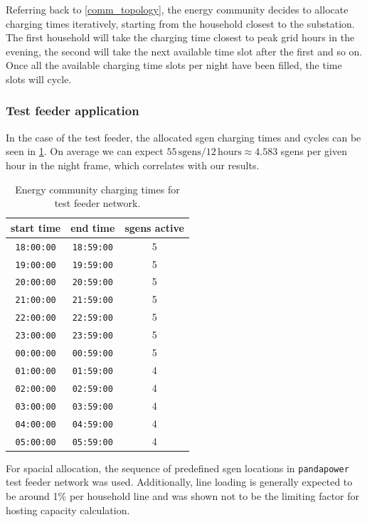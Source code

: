 \documentclass[a4paper,10pt]{report}
\begin{document}
Referring back to \cref{comm_topology}, the energy community decides to allocate charging times iteratively, starting from the household closest to the substation. The first household will take the charging time closest to peak grid hours in the evening, the second will take the next available time slot after the first and so on. Once all the available charging time slots per night have been filled, the time slots will cycle.



\subsubsection{Test feeder application}
In the case of the test feeder, the allocated sgen charging times and cycles can be seen in \cref{sgen_comm_times}. On average we can expect $55\, \text{sgens} / 12\, \text{hours} \approx 4.583$ sgens per given hour in the night frame, which correlates with our results.

\begin{table}[htpb]
	\centering
	\begin{tabular}{c c c}
		\toprule
		start time & end time & sgens active \\
		\midrule
		\texttt{18:00:00} & \texttt{18:59:00} & 5\\
		\texttt{19:00:00} & \texttt{19:59:00} & 5\\
		\texttt{20:00:00} & \texttt{20:59:00} & 5\\
		\texttt{21:00:00} & \texttt{21:59:00} & 5\\
		\texttt{22:00:00} & \texttt{22:59:00} & 5\\
		\texttt{23:00:00} & \texttt{23:59:00} & 5\\
		\texttt{00:00:00} & \texttt{00:59:00} & 5\\
		\texttt{01:00:00} & \texttt{01:59:00} & 4\\
		\texttt{02:00:00} & \texttt{02:59:00} & 4\\
		\texttt{03:00:00} & \texttt{03:59:00} & 4\\
		\texttt{04:00:00} & \texttt{04:59:00} & 4\\
		\texttt{05:00:00} & \texttt{05:59:00} & 4\\
		\bottomrule
	\end{tabular}
	\caption{Energy community charging times for test feeder network.}
	\label{sgen_comm_times}
\end{table}

For spacial allocation, the sequence of predefined sgen locations in \texttt{pandapower} test feeder network was used. Additionally, line loading is generally expected to be around 1\% per household line and was shown not to be the limiting factor for hosting capacity calculation.
\end{document}
